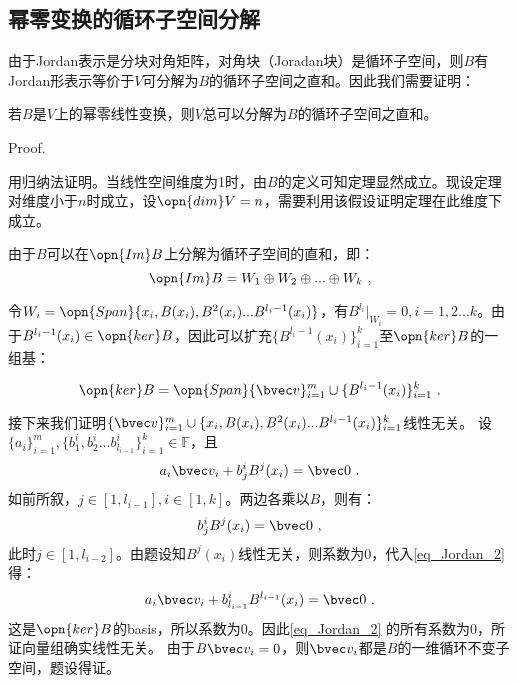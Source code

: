 \subsection{幂零变换的循环子空间分解}

由于Jordan表示是分块对角矩阵，对角块（Joradan块）是循环子空间，则$B$有Jordan形表示等价于$V$可分解为$B$的循环子空间之直和。因此我们需要证明：

\begin{theorem}{}
若$B$是$V$上的幂零线性变换，则$V$总可以分解为$B$的循环子空间之直和。
\end{theorem}
Proof.

用归纳法证明。当线性空间维度为1时，由$B$的定义可知定理显然成立。现设定理对维度小于$n$时成立，设$\opn{dim}V=n$，需要利用该假设证明定理在此维度下成立。

由于$B$可以在$\opn{Im}B$上分解为循环子空间的直和，即：
\begin{equation}
\opn{Im}B=W_1\oplus W_2\oplus...\oplus W_k~,
\end{equation}

令$W_i=\opn{Span}\{x_i,B(x_i),B^2(x_i)...B^{l_i-1}(x_i)\}$，有$B^{l_i}|_{W_i}=0,i=1,2...k$。由于$B^{l_i-1}(x_i)\in \opn{ker}B$，因此可以扩充$\{B^{l_i-1}(x_i)\}^k_{i=1}$至$\opn{ker}B$的一组基：

\begin{equation}
\opn{ker}B=\opn{Span}\{\bvec v\}^m_{i=1}\cup \{B^{l_i-1}(x_i)\}^k_{i=1}~.
\end{equation}

接下来我们证明$\{\bvec v\}^m_{i=1}\cup \{x_i,B(x_i),B^2(x_i)...B^{l_i-1}(x_i)\}^{k}_{i=1}$线性无关。
设$\{a_i\}^m_{i=1},\{b^i_1,b^i_2...b^i_{l_{i-1}}\}^{k}_{i=1}\in\mathbb F$，且
\begin{equation}\label{eq_Jordan_2}
a_i\bvec v_i+b^i_jB^{j}(x_i)=\bvec 0~.
\end{equation}
如前所叙，$j\in[1,l_{i-1}],i\in[1,k]$。两边各乘以$B$，则有：
\begin{equation}
b^i_jB^{j}(x_i)=\bvec 0~,
\end{equation}
此时$j\in[1,l_{i-2}]$。由题设知$B^j(x_i)$线性无关，则系数为$0$，代入\autoref{eq_Jordan_2} 得：
\begin{equation}
a_i\bvec v_i+b^i_{l_{i-1}}B^{l_{i-1}}(x_i)=\bvec 0~.
\end{equation}
这是$\opn{ker}B$的basis，所以系数为$0$。因此\autoref{eq_Jordan_2} 的所有系数为0，所证向量组确实线性无关。
由于$B\bvec v_i=0$，则$\bvec v_i$都是$B$的一维循环不变子空间，题设得证。



